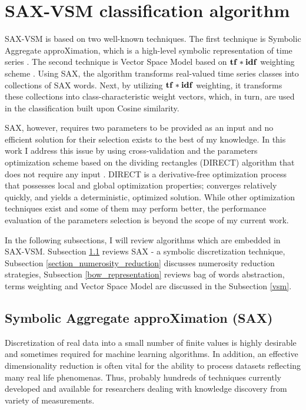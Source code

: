 \section{SAX-VSM classification algorithm} \label{sax_vsm_background}
SAX-VSM is based on two well-known techniques. The first technique is Symbolic Aggregate approXimation, which is a high-level symbolic
representation of time series \cite{sax}. The second technique is Vector Space Model based on $\text{\textbf{tf}}\ast\text{\textbf{idf}}$
weighting scheme \cite{citeulike:300428}. 
Using SAX, the algorithm transforms real-valued time series classes into collections of SAX words. 
Next, by utilizing $\text{\textbf{tf}}\ast\text{\textbf{idf}}$ weighting, it transforms these collections into class-characteristic weight 
vectors, which, in turn, are used in the classification built upon Cosine similarity.

SAX, however, requires two parameters to be provided as an input and no efficient solution for their selection exists to the best of my knowledge. 
In this work I address this issue by using cross-validation and the parameters optimization scheme based on the dividing rectangles (DIRECT) 
algorithm that does not require any input \cite{citeulike:12563460}. 
DIRECT is a derivative-free optimization process that possesses local and global optimization properties; converges relatively quickly, and yields 
a deterministic, optimized solution. While other optimization techniques exist and some of them may perform better, the performance 
evaluation of the parameters selection is beyond the scope of my current work.

In the following subsections, I will review algorithms which are embedded in SAX-VSM. 
Subsection \ref{section-sax} reviews SAX - a symbolic discretization technique, 
Subsection \ref{section_numerosity_reduction} discusses numerosity reduction strategies,
Subsection \ref{bow_representation} reviews bag of words abstraction, 
terms weighting and Vector Space Model are discussed in the Subsection \ref{vsm}. 


\subsection{Symbolic Aggregate approXimation (SAX)}\label{section-sax}
Discretization of real data into a small number of finite values is highly desirable and sometimes required for machine learning 
algorithms. In addition, an effective dimensionality reduction is often vital for the ability to process datasets reflecting 
many real life phenomenas. Thus, probably hundreds of techniques currently developed and available for researchers dealing 
with knowledge discovery from variety of measurements.

